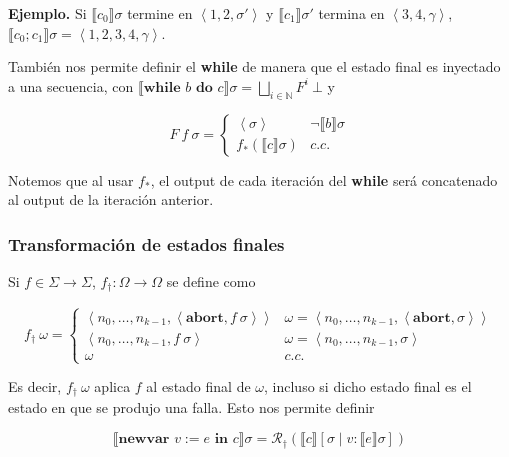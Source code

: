 \documentclass[a4paper, 12pt]{article}
\begin{document}
\textbf{Ejemplo.} Si $\llbracket c_0 \rrbracket \sigma$ termine en $\left<1, 2,
\sigma'\right>$ y $\llbracket c_1 \rrbracket\sigma'$ termina en $\left<3, 4
, \gamma\right>$, $\llbracket c_0;c_1 \rrbracket\sigma = \left<1, 2, 3, 4
, \gamma\right>$.

También nos permite definir el \textbf{while} de manera que el estado final es
inyectado a una secuencia, con $\llbracket \textbf{while } b \textbf{ do } c
\rrbracket\sigma = \bigsqcup_{i \in \mathbb{N}} F^i ~ \bot $ y

\begin{equation*}
  F ~ f ~ \sigma = \begin{cases}
    \left<\sigma \right> & \neg\llbracket b \rrbracket\sigma \\ 
    f_* (\llbracket c \rrbracket \sigma) & c.c.
  \end{cases}
\end{equation*}

Notemos que al usar $f_*$, el output de cada iteración del \textbf{while} será
concatenado al output de la iteración anterior.

\subsubsection{Transformación de estados finales}

Si $f \in \Sigma \to  \Sigma$, $f_\dagger : \Omega\to \Omega$ se define como 

\begin{equation*}
  f_\dagger ~ \omega = \begin{cases}
    \left<n_0, \ldots, n_{k-1}, \left<\textbf{abort}, f ~ \sigma \right> \right>
    & \omega = \left<n_0,\ldots, n_{k-1}, \left<\textbf{abort}, \sigma \right>
    \right> \\ 
    \left<n_0, \ldots, n_{k-1}, f ~ \sigma \right> & \omega = \left< n_0,
    \ldots, n_{k-1}, \sigma\right> \\ 
    \omega & c.c.
  \end{cases}
\end{equation*}

Es decir, $f_\dagger ~ \omega$ aplica $f$ al estado final de $\omega$, incluso
si dicho estado final es el estado en que se produjo una falla. Esto nos permite
definir 

\begin{equation*}
  \llbracket \textbf{newvar } v := e \textbf{ in } c\rrbracket\sigma = \mathcal{R}_\dagger \left( \llbracket c \rrbracket[\sigma \mid v :
  \llbracket e \rrbracket \sigma] \right) 
\end{equation*}
\end{document}
